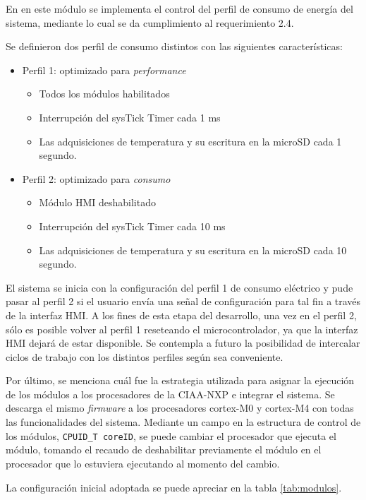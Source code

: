 En en este módulo se implementa el control del perfil de consumo de energía del sistema, mediante lo cual se da cumplimiento al requerimiento  2.4.

Se definieron dos perfil de consumo distintos con las siguientes características:

\begin{itemize}
	\item Perfil 1: optimizado para \textit{performance}
	\begin{itemize}
		\item Todos los módulos habilitados
		\item Interrupción del sysTick Timer cada 1 ms
		\item Las adquisiciones de temperatura y su escritura en la microSD cada 1 segundo. 
	\end{itemize}
	\item Perfil 2: optimizado para \textit{consumo}
	\begin{itemize}
		\item Módulo HMI deshabilitado
		\item Interrupción del sysTick Timer cada 10 ms
		\item Las adquisiciones de temperatura y su escritura en la microSD cada 10 segundo. 
	\end{itemize}
\end{itemize}    

El sistema se inicia con la configuración del perfil 1 de consumo eléctrico y pude pasar al perfil 2 si el usuario envía una señal de configuración para tal fin a través de la interfaz HMI. A los fines de esta etapa del desarrollo, una vez en el perfil 2, sólo es posible volver al perfil 1 reseteando el microcontrolador, ya que la interfaz HMI dejará de estar disponible.  Se contempla a futuro la posibilidad de intercalar ciclos de trabajo con los distintos perfiles según sea conveniente.

Por último, se menciona cuál fue la estrategia utilizada para asignar la ejecución de los módulos a los procesadores de la CIAA-NXP e integrar el sistema.  Se descarga el mismo \textit{firmware} a los  procesadores cortex-M0 y cortex-M4 con todas las funcionalidades del sistema.  Mediante un campo en la estructura de control de los módulos, \texttt{CPUID\_T coreID}, se puede cambiar el procesador que ejecuta el módulo, tomando el recaudo de deshabilitar previamente el módulo en el procesador que lo estuviera ejecutando al momento del cambio.

La configuración inicial adoptada se puede apreciar en la tabla \ref{tab:modulos}.

